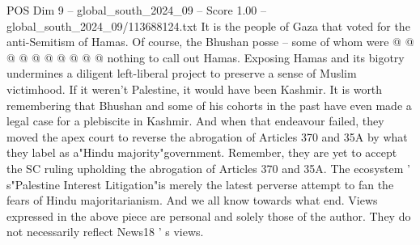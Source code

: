 \begin{textsample}{POS Dim 9 – global\_south\_2024\_09 – Score 1.00 – global\_south\_2024\_09/113688124.txt}
It is the people of Gaza that voted for the anti-Semitism of Hamas.
Of course, the Bhushan posse -- some of whom were @ @ @ @ @ @ @ @ @ @ nothing to call out Hamas.
Exposing Hamas and its bigotry undermines a diligent left-liberal project to preserve a sense of Muslim victimhood.
If it weren't Palestine, it would have been Kashmir.
It is worth remembering that Bhushan and some of his cohorts in the past have even made a legal case for a plebiscite in Kashmir.
And when that endeavour failed, they moved the apex court to reverse the abrogation of Articles 370 and 35A by what they label as a"Hindu majority"government.
Remember, they are yet to accept the SC ruling upholding the abrogation of Articles 370 and 35A.
The ecosystem ' s"Palestine Interest Litigation"is merely the latest perverse attempt to fan the fears of Hindu majoritarianism.
And we all know towards what end.
Views expressed in the above piece are personal and solely those of the author.
They do not necessarily reflect News18 ' s views.

\end{textsample}

